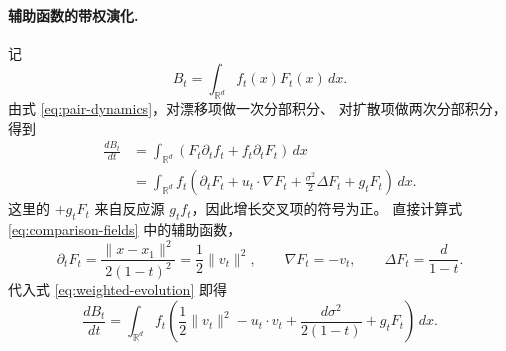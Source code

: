 \documentclass[UTF8,a4paper,11pt,fontset=fandol]{ctexart}
\begin{document}
\paragraph{辅助函数的带权演化.}
记
\begin{equation}
B_t=\int_{\mathbb R^d}f_t(x)F_t(x)\,dx.
\end{equation}
由式 \eqref{eq:pair-dynamics}，对漂移项做一次分部积分、
对扩散项做两次分部积分，得到
\begin{equation}
\begin{aligned}
\frac{dB_t}{dt}
&=\int_{\mathbb R^d}
\left(F_t\partial_t f_t+f_t\partial_tF_t\right)\,dx\\
&=\int_{\mathbb R^d}
f_t\left(
\partial_tF_t+u_t\cdot\nabla F_t
+\frac{\sigma^2}{2}\Delta F_t+g_tF_t
\right)\,dx.
\end{aligned}
\label{eq:weighted-evolution}
\end{equation}
这里的 $+g_tF_t$ 来自反应源 $g_tf_t$，因此增长交叉项的符号为正。
直接计算式 \eqref{eq:comparison-fields} 中的辅助函数，
\begin{equation}
\partial_tF_t
=\frac{\|x-x_1\|^2}{2(1-t)^2}
=\frac12\|v_t\|^2,
\qquad
\nabla F_t=-v_t,
\qquad
\Delta F_t=\frac{d}{1-t}.
\label{eq:auxiliary-derivatives}
\end{equation}
代入式 \eqref{eq:weighted-evolution} 即得
\begin{equation}
\frac{dB_t}{dt}
=\int_{\mathbb R^d}
f_t\left(
\frac12\|v_t\|^2-u_t\cdot v_t
+\frac{d\sigma^2}{2(1-t)}+g_tF_t
\right)\,dx.
\label{eq:boundary-derivative}
\end{equation}
\end{document}
